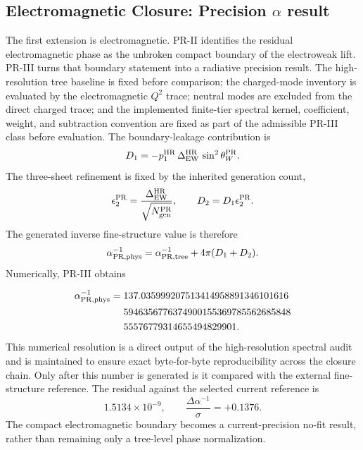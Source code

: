 \documentclass[11pt]{article}
\begin{document}
\subsection{Electromagnetic Closure: Precision \texorpdfstring{$\alpha$}{alpha} result}
\label{subsec:priii-alpha-obligation}

The first extension is electromagnetic.  PR-II identifies the residual electromagnetic phase as the unbroken compact boundary of the electroweak lift.  PR-III turns that boundary statement into a radiative precision result.  The high-resolution tree baseline is fixed before comparison; the charged-mode inventory is evaluated by the electromagnetic \(Q^2\) trace; neutral modes are excluded from the direct charged trace; and the implemented finite-tier spectral kernel, coefficient, weight, and subtraction convention are fixed as part of the admissible PR-III class before evaluation. The boundary-leakage contribution is
\begin{equation}
D_1
=
-p_1^{\rm HR}\,\Delta_{\rm EW}^{\rm HR}\,\sin^2\theta_W^{\rm PR} .
\end{equation}
The three-sheet refinement is fixed by the inherited generation count,
\begin{equation}
\epsilon_2^{\rm PR}
=
\frac{\Delta_{\rm EW}^{\rm HR}}{\sqrt{N_{\rm gen}^{\rm PR}}},
\qquad
D_2=D_1\epsilon_2^{\rm PR} .
\end{equation}
The generated inverse fine-structure value is therefore
\begin{equation}
\alpha_{\rm PR,phys}^{-1}
=
\alpha_{\rm PR,tree}^{-1}+4\pi(D_1+D_2).
\end{equation}
Numerically, PR-III obtains

\begin{equation}
\begin{split}
\alpha_{\rm PR,phys}^{-1} ={} & 137.035999207513414958891346101616 \\
& 5946356776374900155369785562685848 \\
& 55576779314655494829901.
\end{split}
\end{equation}
This numerical resolution is a direct output of the high-resolution spectral audit and is maintained to ensure exact byte-for-byte reproducibility across the closure chain.
Only after this number is generated is it compared with the external fine-structure reference.  The residual against the selected current reference is
\begin{equation}
1.5134\times 10^{-9},
\qquad
\frac{\Delta\alpha^{-1}}{\sigma}=+0.1376 .
\end{equation}
The compact electromagnetic boundary becomes a current-precision no-fit result, rather than remaining only a tree-level phase normalization.
\end{document}

